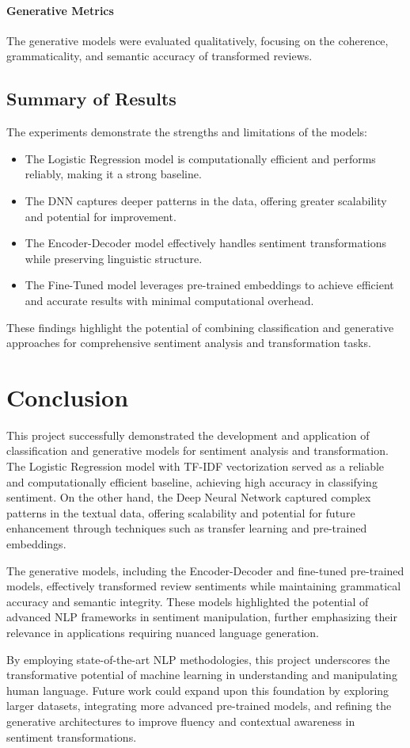 \documentclass{article}
\begin{document}
\paragraph{Generative Metrics}
The generative models were evaluated qualitatively, focusing on the coherence, grammaticality, and semantic accuracy of transformed reviews.

\subsection{Summary of Results}
The experiments demonstrate the strengths and limitations of the models:
\begin{itemize}
    \item The Logistic Regression model is computationally efficient and performs reliably, making it a strong baseline.
    \item The DNN captures deeper patterns in the data, offering greater scalability and potential for improvement.
    \item The Encoder-Decoder model effectively handles sentiment transformations while preserving linguistic structure.
    \item The Fine-Tuned model leverages pre-trained embeddings to achieve efficient and accurate results with minimal computational overhead.
\end{itemize}
These findings highlight the potential of combining classification and generative approaches for comprehensive sentiment analysis and transformation tasks.


\section*{Conclusion}

This project successfully demonstrated the development and application of classification and generative models for sentiment analysis and transformation. The Logistic Regression model with TF-IDF vectorization served as a reliable and computationally efficient baseline, achieving high accuracy in classifying sentiment. On the other hand, the Deep Neural Network captured complex patterns in the textual data, offering scalability and potential for future enhancement through techniques such as transfer learning and pre-trained embeddings.

The generative models, including the Encoder-Decoder and fine-tuned pre-trained models, effectively transformed review sentiments while maintaining grammatical accuracy and semantic integrity. These models highlighted the potential of advanced NLP frameworks in sentiment manipulation, further emphasizing their relevance in applications requiring nuanced language generation.

By employing state-of-the-art NLP methodologies, this project underscores the transformative potential of machine learning in understanding and manipulating human language. Future work could expand upon this foundation by exploring larger datasets, integrating more advanced pre-trained models, and refining the generative architectures to improve fluency and contextual awareness in sentiment transformations.
\end{document}
